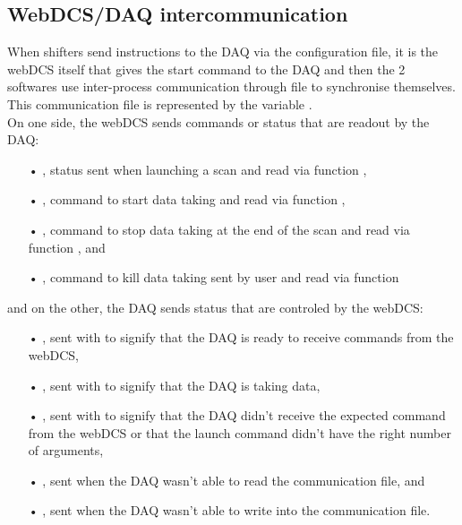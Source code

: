     \subsection{WebDCS/DAQ intercommunication}
    \label{app1:ssec:dcsdaqcomm}
    
    When shifters send instructions to the DAQ via the configuration file, it is the webDCS itself that gives the start command to the DAQ and then the 2 softwares use inter-process communication through file to synchronise themselves. This communication file is represented by the variable .\\
    On one side, the webDCS sends commands or status that are readout by the DAQ:
    \begin{itemize}
    	\item[•] , status sent when launching a scan and read via function ,
    	\item[•] , command to start data taking and read via function ,
    	\item[•] , command to stop data taking at the end of the scan and read via function , and
    	\item[•] , command to kill data taking sent by user and read via function 
    \end{itemize}
and on the other, the DAQ sends status that are controled by the webDCS:
    \begin{itemize}
    	\item[•] , sent with  to signify that the DAQ is ready to receive commands from the webDCS,
    	\item[•] , sent with  to signify that the DAQ is taking data,
    	\item[•] , sent with  to signify that the DAQ didn't receive the expected command from the webDCS or that the launch command didn't have the right number of arguments,
    	\item[•] , sent when the DAQ wasn't able to read the communication file, and
    	\item[•] , sent when the DAQ wasn't able to write into the communication file.
    \end{itemize}
    
